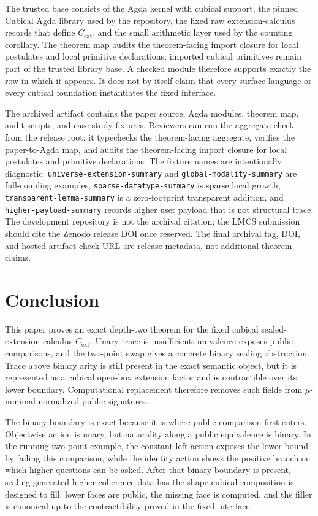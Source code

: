 \documentclass{lmcs}
\begin{document}
The trusted base consists of the Agda kernel with cubical support, the pinned
Cubical Agda library used by the repository, the fixed raw extension-calculus
records that define \(C_{\mathrm{ext}}\), and the small arithmetic layer used by
the counting corollary.  The theorem map audits the theorem-facing import
closure for local postulates and local primitive declarations; imported cubical
primitives remain part of the trusted library base.  A checked module therefore
supports exactly the row in which it appears.  It does not by itself claim that
every surface language or every cubical foundation instantiates the fixed
interface.

The archived artifact contains the paper source, Agda modules, theorem map,
audit scripts, and case-study fixtures.  Reviewers can run the aggregate check
from the release root; it typechecks the theorem-facing aggregate, verifies the
paper-to-Agda map, and audits the theorem-facing import closure for local
postulates and primitive declarations.  The fixture names are intentionally
diagnostic: \texttt{universe-extension-summary} and
\texttt{global-modality-summary} are full-coupling examples,
\texttt{sparse-datatype-summary} is sparse local growth,
\texttt{transparent-lemma-summary} is a zero-footprint transparent addition,
and \texttt{higher-payload-summary} records higher user payload that is not
structural trace.  The development repository is not the archival citation; the
LMCS submission should cite the Zenodo release DOI once reserved.  The final
archival tag, DOI, and hosted artifact-check URL are release metadata, not
additional theorem claims.


\section{Conclusion}

This paper proves an exact depth-two theorem for the fixed cubical
sealed-extension calculus \(C_{\mathrm{ext}}\).  Unary trace is insufficient:
univalence exposes public comparisons, and the two-point swap gives a concrete
binary sealing obstruction.  Trace above binary arity is still present in the
exact semantic object, but it is represented as a cubical open-box extension
factor and is contractible over its lower boundary.  Computational replacement
therefore removes such fields from \(\mu\)-minimal normalized public signatures.

The binary boundary is exact because it is where public comparison first enters.
Objectwise action is unary, but naturality along a public equivalence is binary.
In the running two-point example, the constant-left action exposes the lower
bound by failing this comparison, while the identity action shows the positive
branch on which higher questions can be asked.  After that binary boundary is
present, sealing-generated higher coherence data has the shape cubical
composition is designed to fill: lower faces are public, the missing face is
computed, and the filler is canonical up to the contractibility proved in the
fixed interface.
\end{document}
